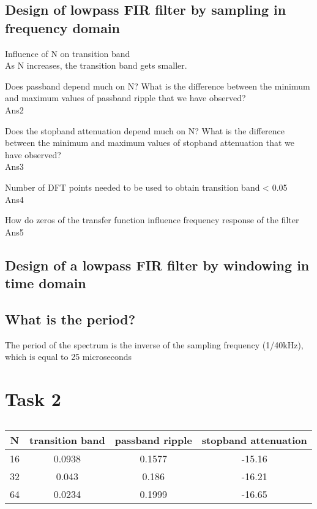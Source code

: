 \documentclass{article}
\begin{document}
\subsection*{Design of lowpass FIR filter by sampling in frequency domain}
Influence of N on transition band \\
As N increases, the transition band gets smaller.

Does passband depend much on N? What is the difference between
the minimum and maximum values of passband ripple that we have
observed? \\
Ans2

Does the stopband attenuation depend much on N? What is the difference between 
the minimum and maximum values of stopband attenuation that we have observed? \\
Ans3

Number of DFT points needed to be used to obtain transition band < 0.05 \\
Ans4

How do zeros of the transfer function influence frequency response of the filter \\
Ans5

\subsection*{Design of a lowpass FIR filter by windowing in time domain}

\subsection*{What is the period?}
The period of the spectrum is the inverse of the sampling frequency (1/40kHz),
which is equal to 25 microseconds

\section*{Task 2}
\begin{table}[h!]
  \begin{center}
    \caption{}
    \label{tab:task1tab}
    \begin{tabular}{c|c|c|c} 
      \textbf{N} & \textbf{transition band} & \textbf{passband ripple} 
      & \textbf{stopband attenuation} \\
      \hline
        16 & 0.0938 & 0.1577 & -15.16 \\
        32 & 0.043  & 0.186  & -16.21 \\
        64 & 0.0234 & 0.1999 & -16.65 \\
    \end{tabular}
  \end{center}
\end{table}
\end{document}
